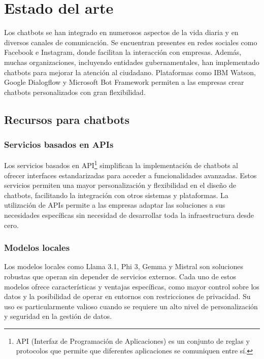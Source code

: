  


 

\section{Estado del arte}

Los chatbots se han integrado en numerosos aspectos de la vida diaria y en diversos canales de comunicación. Se encuentran presentes en redes sociales como Facebook e Instagram, donde facilitan la interacción con empresas. Además, muchas organizaciones, incluyendo entidades gubernamentales, han implementado chatbots para mejorar la atención al ciudadano. Plataformas como IBM Watson, Google Dialogflow y Microsoft Bot Framework permiten a las empresas crear chatbots personalizados con gran flexibilidad.

\subsection{Recursos para chatbots}

\subsubsection{Servicios basados en APIs}
Los servicios basados en API\footnote{API (Interfaz de Programación de Aplicaciones) es un conjunto de reglas y protocolos que permite que diferentes aplicaciones se comuniquen entre sí.} simplifican la implementación de chatbots al ofrecer interfaces estandarizadas para acceder a funcionalidades avanzadas. Estos servicios permiten una mayor personalización y flexibilidad en el diseño de chatbots, facilitando la integración con otros sistemas y plataformas. La utilización de APIs permite a las empresas adaptar las soluciones a sus necesidades específicas sin necesidad de desarrollar toda la infraestructura desde cero.


\subsubsection{Modelos locales}
Los modelos locales como Llama 3.1, Phi 3, Gemma y Mistral son soluciones robustas que operan sin depender de servicios externos. Cada uno de estos modelos ofrece características y ventajas específicas, como mayor control sobre los datos y la posibilidad de operar en entornos con restricciones de privacidad. Su uso es particularmente valioso cuando se requiere un alto nivel de personalización y seguridad en la gestión de datos.


